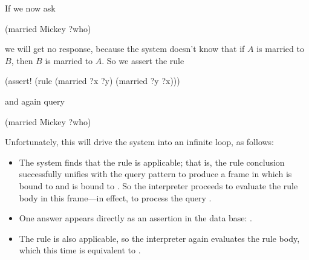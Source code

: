 \noindent
If we now ask

\begin{codeBlock}
(married Mickey ?who)
\end{codeBlock}

\noindent
we will get no response, because the system doesn't know that if \( A \) is
married to \( B \), then \( B \) is married to \( A \).  So we assert the rule

\begin{codeBlock}
(assert! (rule (married ?x ?y) (married ?y ?x)))
\end{codeBlock}

\noindent
and again query

\begin{codeBlock}
(married Mickey ?who)
\end{codeBlock}

\noindent
Unfortunately, this will drive the system into an infinite loop, as follows:

\begin{itemize}
\item
The system finds that the  rule is applicable; that is, the rule
conclusion  successfully unifies with the query pattern
 to produce a frame in which  is bound to
 and  is bound to .  So the interpreter
proceeds to evaluate the rule body  in this frame---in
effect, to process the query .

\item
One answer appears directly as an assertion in the data base: .

\item
The  rule is also applicable, so the interpreter again evaluates
the rule body, which this time is equivalent to .
\end{itemize}

